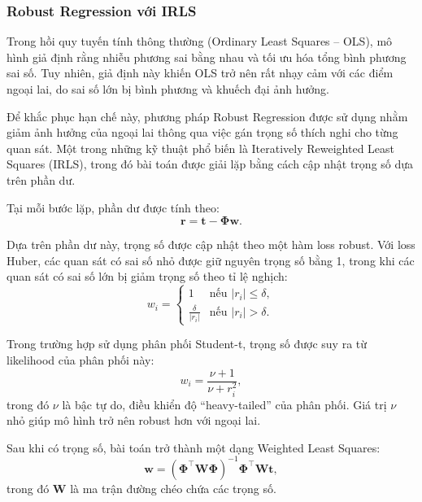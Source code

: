 \subsubsection{Robust Regression với IRLS}

Trong hồi quy tuyến tính thông thường (Ordinary Least Squares -- OLS), mô hình
giả định rằng nhiễu phương sai bằng nhau và tối ưu hóa tổng bình phương sai số.
Tuy nhiên, giả định này khiến OLS trở nên rất nhạy cảm với các điểm ngoại lai,
do sai số lớn bị bình phương và khuếch đại ảnh hưởng.

Để khắc phục hạn chế này, phương pháp Robust Regression được sử dụng nhằm giảm
ảnh hưởng của ngoại lai thông qua việc gán trọng số thích nghi cho từng quan
sát. Một trong những kỹ thuật phổ biến là Iteratively Reweighted Least Squares
(IRLS), trong đó bài toán được giải lặp bằng cách cập nhật trọng số dựa trên
phần dư.

Tại mỗi bước lặp, phần dư được tính theo: \begin{equation}
  \boldsymbol{r} = \boldsymbol{t} - \boldsymbol{\Phi}\boldsymbol{w}.
\end{equation}

Dựa trên phần dư này, trọng số được cập nhật theo một hàm loss robust. Với loss
Huber, các quan sát có sai số nhỏ được giữ nguyên trọng số bằng 1, trong khi
các quan sát có sai số lớn bị giảm trọng số theo tỉ lệ nghịch: \begin{equation}
  w_i = \begin{cases}
    1 & \text{nếu } \lvert r_i\rvert \leq \delta, \\
    \frac{\delta}{\lvert r_i\rvert} & \text{nếu } \lvert r_i\rvert > \delta.
  \end{cases}
\end{equation}

Trong trường hợp sử dụng phân phối Student-t, trọng số được suy ra từ
likelihood của phân phối này: \begin{equation}
  w_i = \frac{\nu + 1}{\nu + r_i^2},
\end{equation} trong đó $\nu$ là bậc tự do, điều khiển độ “heavy-tailed” của
phân phối. Giá trị $\nu$ nhỏ giúp mô hình trở nên robust hơn với ngoại lai.

Sau khi có trọng số, bài toán trở thành một dạng Weighted Least Squares:
\begin{equation}
  \boldsymbol{w} =
  (\boldsymbol{\Phi}^\intercal \boldsymbol{W} \boldsymbol{\Phi})^{-1}
  \boldsymbol{\Phi}^\intercal \boldsymbol{W} \boldsymbol{t},
\end{equation} trong đó $\boldsymbol{W}$ là ma trận đường chéo chứa các trọng
số.

